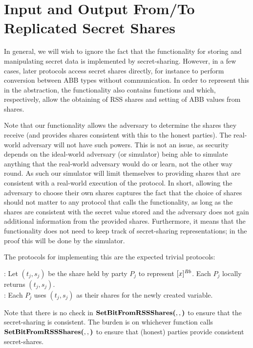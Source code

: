\section{Input and Output From/To Replicated Secret Shares}

In general, we will wish to ignore the fact that the functionality
for storing and manipulating secret data is implemented by secret-sharing.
However, in a few cases, later protocols access secret shares directly,
for instance to perform conversion between ABB types without communication.
In order to represent this in the abstraction, the functionality also
contains functions \GetBitShares{} and \SetBitFromShares{}{}{}
which, respectively, allow the obtaining of RSS shares and setting of 
ABB values from shares.

Note that our functionality allows the adversary to determine the shares
they receive (and provides shares consistent with this to the honest parties).
The real-world adversary will not have such powers.
This is not an issue, as security depends on the ideal-world adversary
(or simulator) being able to simulate anything that the real-world adversary
would do or learn, not the other way round.
As such our simulator will limit themselves to providing shares that 
are consistent with a real-world execution of the protocol.
In short, allowing the adversary to choose their own shares
captures the fact that the choice of shares should not matter to
any protocol that calls the functionality, as long as the shares
are consistent with the secret value stored and the adversary
does not gain additional information from the provided shares.
Furthermore, it means that the functionality does not need to
keep track of secret-sharing representations;
in the proof this will be done by the simulator.

The protocols for implementing this are the expected trivial protocols:

\begin{protocol}
	:
		Let $(t_j, s_j)$ be the share held by party $P_j$ to represent $[x]^{Bb}$.
		Each $P_j$ locally returns $(t_j, s_j)$.\\

\noindent	{}:
		Each $P_j$ uses $(t_j, s_j)$ as their shares for the newly created variable.

\end{protocol}

\noindent Note that there is no check in $\textbf{SetBitFromRSSShares(}, , \textbf{)}$ to ensure that the secret-sharing is
consistent. The burden is on whichever function calls $\textbf{SetBitFromRSSShares(}, , \textbf{)}$ to ensure
that (honest) parties provide consistent secret-shares.



